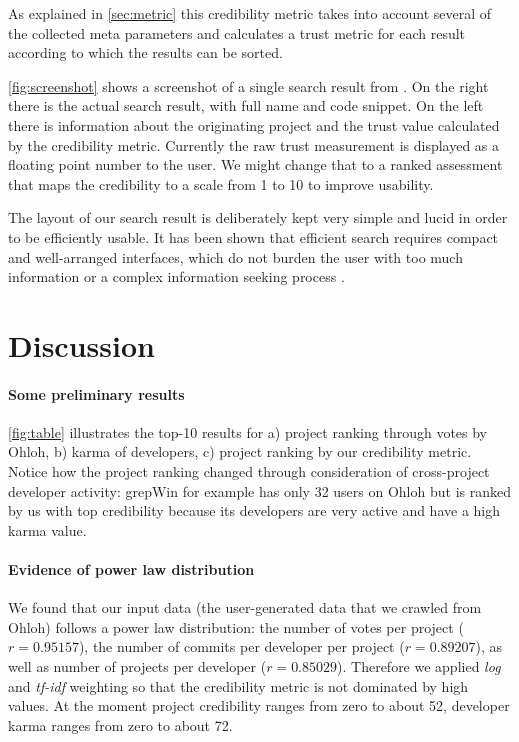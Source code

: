 As explained in \autoref{sec:metric} this credibility metric takes into account several of the collected meta parameters and calculates a trust metric for each result according to which the results can be sorted.

\autoref{fig:screenshot} shows a screenshot of a single search result from \Jbd. On the right there is the actual search result, with full name and code snippet. On the left there is information about the originating project and the trust value calculated by the credibility metric. Currently the raw trust measurement is displayed as a floating point number to the user. We might change that to a ranked assessment that maps the credibility to a scale from 1 to 10 to improve usability. 

The layout of our search result is deliberately kept very simple and lucid in order to be efficiently usable. It has been shown that efficient search requires compact and well-arranged interfaces, which do not burden the user with too much information or a complex information seeking process \cite{Hear09a}. 


\section{Discussion}
\label{sec:discussion}

\paragraph{Some preliminary results}
\autoref{fig:table} illustrates the top-10 results for a) project ranking through votes by Ohloh, b) karma of developers, c) project ranking by our credibility metric. Notice how the project ranking changed through consideration of cross-project developer activity: grepWin for example has only 32 users on Ohloh but is ranked by us with top credibility because its developers are very active and have a high karma value.

\paragraph{Evidence of power law distribution} 
We found that our input data (\ie the user-generated data that we crawled from Ohloh) follows a power law distribution: the number of votes per project ($r = 0.95157$), the number of commits per developer per project ($r = 0.89207$), as well as number of projects per developer ($r = 0.85029$). Therefore we applied \emph{log} and \emph{tf-idf} weighting so that the credibility metric is not dominated by high values.
At the moment project credibility ranges from zero to about 52, developer karma ranges from zero to about 72.

